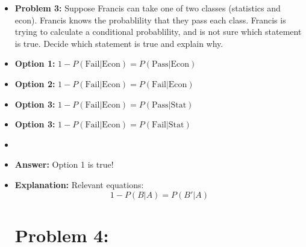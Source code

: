 \documentclass{article}
\begin{document}
    \begin{itemize}
        \item[] \textbf{Problem 3:} Suppose Francis can take one of two classes (statistics and econ). Francis knows the probablility that
        they pass each class. Francis is trying to calculate a conditional probablility, and is not sure which statement is true. Decide which 
        statement is true and explain why.
        \item[] \textbf{Option 1:} $1-P(\text{Fail}| \text{Econ}) = P(\text{Pass} | \text{Econ})$
        \item[] \textbf{Option 2:} $1-P(\text{Fail}| \text{Econ}) = P(\text{Fail} | \text{Econ})$
        \item[] \textbf{Option 3:} $1-P(\text{Fail}| \text{Econ}) = P(\text{Pass} | \text{Stat})$
        \item[] \textbf{Option 3:} $1-P(\text{Fail}| \text{Econ}) = P(\text{Fail} | \text{Stat})$
        \item[]
        \item[] \textbf{Answer:} Option 1 is true!
        \item[] \textbf{Explanation:} Relevant equations:
        \[
            1 - P(B|A) = P(B'|A)
        \]

\newpage

\section{Problem 4:}
    

\end{itemize}
\end{document}
